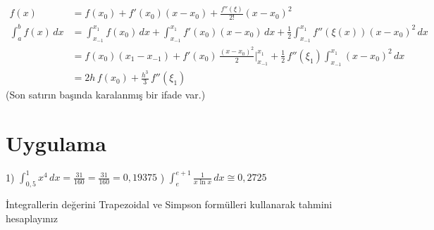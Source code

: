 \documentclass[11pt,a4paper]{article}
\begin{document}
\begin{align*}
  f(x) &= f(x_0) + f'(x_0)(x-x_0) + \frac{f''(\xi)}{2!}(x-x_0)^2\\
  \int_a^b f(x)\,dx &= \int_{x_{-1}}^{x_1} f(x_0)\,dx + \int_{x_{-1}}^{x_1} f'(x_0)(x-x_0)\,dx
    + \frac{1}{2}\int_{x_{-1}}^{x_1} f''(\xi(x))(x-x_0)^2\,dx\\
  &= f(x_0)(x_1 - x_{-1}) + f'(x_0)\,\frac{(x-x_0)^2}{2}\bigg|_{x_{-1}}^{x_1}
    + \frac{1}{2}\,f''(\xi_1)\int_{x_{-1}}^{x_1}(x-x_0)^2\,dx\\
  &= 2h\,f(x_0) + \frac{h^3}{3}\,f''(\xi_1)
\end{align*}
{\small\color{kursunkalem}(Son satırın başında karalanmış bir ifade var.)}

\section{Uygulama}
\begin{ornek}
1) $\displaystyle\int_{0{,}5}^{1} x^4\,dx = \frac{31}{160} = \frac{31}{160} = 0{,}19375$ ) $\displaystyle\int_{e}^{e+1} \frac{1}{x\ln x}\,dx \cong 0{,}2725$

İntegrallerin değerini Trapezoidal ve Simpson formülleri kullanarak tahmini hesaplayınız
\end{ornek}
\end{document}
